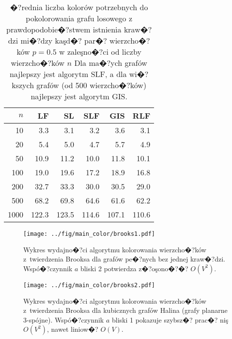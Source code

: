 \documentclass[12pt,a4paper]{mwrep}
\begin{document}
\begin{table}
\centering
\caption[Wyniki kolorowania grafów przypadkowych z $p=0.5$.]{
�?rednia liczba kolorów potrzebnych do pokolorowania grafu 
losowego z prawdopodobie�?stwem istnienia kraw�?dzi mi�?dzy kaşd�? par�? 
wierzcho�?ków $p=0.5$ w zaleşno�?ci od liczby wierzcho�?ków $n$
Dla ma�?ych grafów najlepszy jest algorytm SLF, a dla wi�?kszych grafów
(od 500 wierzcho�?ków) najlepszy jest algorytm GIS.
\label{tab:kolory05}}
\begin{tabular}{|r|r|r|r|r|r|}
  \hline 
$n$  & \textbf{LF} & \textbf{SL} & \textbf{SLF}  & \textbf{GIS}  & \textbf{RLF}  \\
  \hline 
10   &3.3  &3.1  &3.2  &3.6  &3.1  \\
  \hline 
20   &5.4  &5.0  &4.7  &5.7  &4.9  \\
  \hline 
50   &10.9  &11.2  &10.0  &11.8  &10.1  \\
  \hline 
100  &19.0  &19.6  &17.2  &18.9  &16.8  \\
  \hline 
200  &32.7  &33.3  &30.0  &30.5  &29.0  \\
  \hline 
500  &68.2  &69.8  &64.6  &61.6  &62.2  \\
  \hline 
1000 &122.3  &123.5  &114.6  &107.1  &110.6  \\
  \hline 
\end{tabular} 
\end{table}





\begin{figure}
\centering
\texttt{[image: ../fig/main\_color/brooks1.pdf]}
\caption[Wydajno�?�? algorytmu z twierdzenia Brooksa (grafy prawie pe�?ne).]{
\label{fig:nodecolorbrooks1}
Wykres wydajno�?ci algorytmu kolorowania wierzcho�?ków z~twierdzenia Brooksa
dla grafów pe�?nych bez jednej kraw�?dzi.
Wspó�?czynnik $a$ bliski 2 potwierdza z�?oşono�?�? $O(V^2)$.}
\end{figure}


\begin{figure}
\centering
\texttt{[image: ../fig/main\_color/brooks2.pdf]}
\caption[Wydajno�?�? algorytmu z twierdzenia Brooksa (grafy Halina).]{
\label{fig:nodecolorbrooks2}
Wykres wydajno�?ci algorytmu kolorowania wierzcho�?ków z~twierdzenia Brooksa
dla kubicznych grafów Halina (grafy planarne 3-spójne).
Wspó�?czynnik $a$ bliski 1 pokazuje szybsz�? prac�? niş $O(V^2)$,
nawet liniow�? $O(V)$.}
\end{figure}
\end{document}
